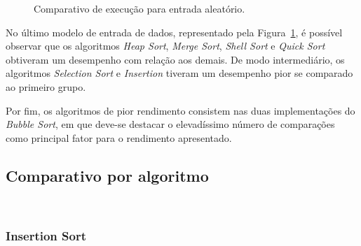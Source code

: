 \documentclass[conference,onecolumn]{IEEEtran}
\begin{document}
\begin{figure}[H]

\centering
{}

\caption{Comparativo de execução para entrada aleatório.}
\label{image: aleatoria}
\end{figure}

No último modelo de entrada de dados, representado pela Figura~\ref{image: aleatoria}, é possível observar que os algoritmos \textit{Heap Sort}, \textit{Merge Sort}, \textit{Shell Sort} e \textit{Quick Sort} obtiveram um desempenho com relação aos demais. De modo intermediário, os algoritmos \textit{Selection Sort} e \textit{Insertion} tiveram um desempenho pior se comparado ao primeiro grupo. 

Por fim, os algoritmos de pior rendimento consistem nas duas implementações do \textit{Bubble Sort}, em que deve-se destacar o elevadíssimo número de comparações como principal fator para o rendimento apresentado.


\subsection{Comparativo por algoritmo}
~\\
\subsubsection{Insertion Sort}
\end{document}
